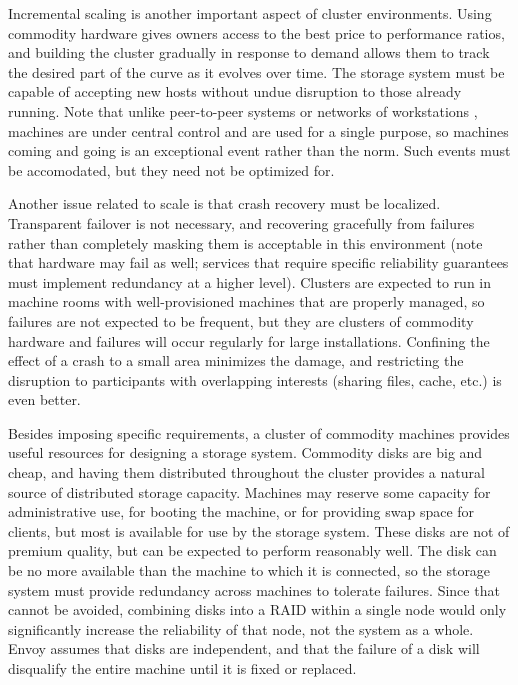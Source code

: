 Incremental scaling is another important aspect of cluster environments. Using commodity hardware gives owners access to the best price to performance ratios, and building the cluster gradually in response to demand allows them to track the desired part of the curve as it evolves over time. The storage system must be capable of accepting new hosts without undue disruption to those already running. Note that unlike peer-to-peer systems \cite{blake} or networks of workstations \cite{anderson95a}, machines are under central control and are used for a single purpose, so machines coming and going is an exceptional event rather than the norm. Such events must be accomodated, but they need not be optimized for.

Another issue related to scale is that crash recovery must be localized. Transparent failover is not necessary, and recovering gracefully from failures rather than completely masking them \cite{baker94} is acceptable in this environment (note that hardware may fail as well; services that require specific reliability guarantees must implement redundancy at a higher level). Clusters are expected to run in machine rooms with well-provisioned machines that are properly managed, so failures are not expected to be frequent, but they are clusters of commodity hardware and failures will occur regularly for large installations. Confining the effect of a crash to a small area minimizes the damage, and restricting the disruption to participants with overlapping interests (sharing files, cache, etc.) is even better.

Besides imposing specific requirements, a cluster of commodity machines provides useful resources for designing a storage system. Commodity disks are big and cheap, and having them distributed throughout the cluster provides a natural source of distributed storage capacity. Machines may reserve some capacity for administrative use, for booting the machine, or for providing swap space for clients, but most is available for use by the storage system. These disks are not of premium quality, but can be expected to perform reasonably well. The disk can be no more available than the machine to which it is connected, so the storage system must provide redundancy across machines to tolerate failures. Since that cannot be avoided, combining disks into a RAID within a single node would only significantly increase the reliability of that node, not the system as a whole. Envoy assumes that disks are independent, and that the failure of a disk will disqualify the entire machine until it is fixed or replaced.

